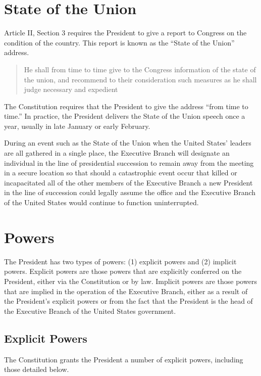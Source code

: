 \section{State of the Union}
Article II, Section 3 requires the President to give a report to Congress on the condition of the country.  This report is known as the ``State of the Union'' address.

\begin{quote}
He shall from time to time give to the Congress information of the state of the union, and recommend to their consideration such measures as he shall judge necessary and expedient
\end{quote}

The Constitution requires that the President to give the address ``from time to time.'' In practice, the President delivers the State of the Union speech once a year, usually in late January or early February.

During an event such as the State of the Union when the United States' leaders are all gathered in a single place, the Executive Branch will designate an individual in the line of presidential succession to remain away from the meeting in a secure location so that should a catastrophic event occur that killed or incapacitated all of the other members of the Executive Branch a new President in the line of succession could legally assume the office and the Executive Branch of the United States would continue to function uninterrupted.


\section{Powers}
The President has two types of powers: (1) explicit powers and (2) implicit powers.  Explicit powers are those powers that are explicitly conferred on the President, either via the Constitution or by law.  Implicit powers are those powers that are implied in the operation of the Executive Branch, either as a result of the President's explicit powers or from the fact that the President is the head of the Executive Branch of the United States government.

\subsection{Explicit Powers}
The Constitution grants the President a number of explicit powers, including those detailed below.


